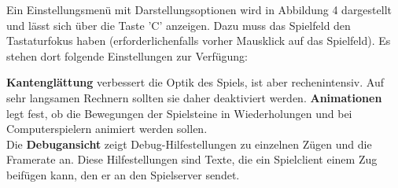 \documentclass[a4paper, ngerman]{scrartcl}
\begin{document}
	Ein Einstellungsmenü mit Darstellungsoptionen wird in Abbildung 4 dargestellt
	und lässt sich über die Taste 'C' anzeigen. Dazu muss das
Spielfeld den Tastaturfokus haben (erforderlichenfalls
vorher Mausklick auf das Spielfeld). Es stehen dort
folgende Einstellungen zur Verfügung: 

\textbf{Kantenglättung} verbessert die Optik des
Spiels, ist aber rechenintensiv. Auf sehr langsamen Rechnern sollten sie daher
deaktiviert werden.
\textbf{Animationen} legt fest, ob die Bewegungen der Spielsteine in
Wiederholungen und bei Computerspielern animiert werden sollen.\\
Die \textbf{Debugansicht} zeigt Debug-Hilfestellungen zu einzelnen Zügen und
die Framerate an.
Diese Hilfestellungen sind Texte, die ein Spielclient einem Zug beifügen kann, den er
an den Spielserver sendet.
	
\end{document}
